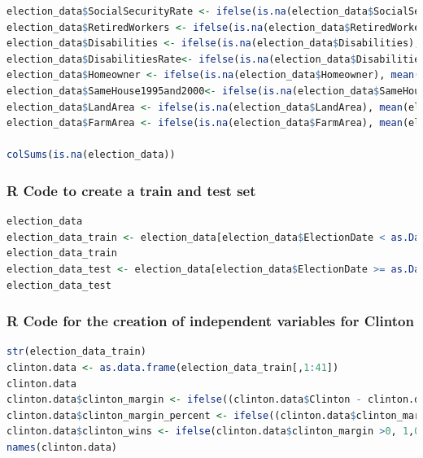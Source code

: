 \documentclass[11pt]{article}
\begin{document}
\begin{lstlisting}[language=R]
election_data$SocialSecurityRate <- ifelse(is.na(election_data$SocialSecurityRate), mean(election_data$SocialSecurityRate, na.rm=TRUE), election_data$SocialSecurityRate)
election_data$RetiredWorkers <- ifelse(is.na(election_data$RetiredWorkers), mean(election_data$RetiredWorkers, na.rm=TRUE), election_data$RetiredWorkers)
election_data$Disabilities <- ifelse(is.na(election_data$Disabilities), mean(election_data$Disabilities, na.rm=TRUE), election_data$Disabilities)
election_data$DisabilitiesRate<- ifelse(is.na(election_data$DisabilitiesRate), mean(election_data$DisabilitiesRate, na.rm=TRUE), election_data$DisabilitiesRate)
election_data$Homeowner <- ifelse(is.na(election_data$Homeowner), mean(election_data$Homeowner, na.rm=TRUE), election_data$Homeowner)
election_data$SameHouse1995and2000<- ifelse(is.na(election_data$SameHouse1995and2000), mean(election_data$SameHouse1995and2000, na.rm=TRUE), election_data$SameHouse1995and2000)
election_data$LandArea <- ifelse(is.na(election_data$LandArea), mean(election_data$LandArea, na.rm=TRUE), election_data$LandArea)
election_data$FarmArea <- ifelse(is.na(election_data$FarmArea), mean(election_data$FarmArea, na.rm=TRUE), election_data$FarmArea)

colSums(is.na(election_data))
\end{lstlisting}


\subsubsection{R Code to create a train and test set}
\begin{lstlisting}[language=R]
election_data
election_data_train <- election_data[election_data$ElectionDate < as.Date("2/19/08", format="%m/%d/%y"),]
election_data_train
election_data_test <- election_data[election_data$ElectionDate >= as.Date("2/19/2008", format="%m/%d/%Y"),]
election_data_test
\end{lstlisting}

\subsubsection{R Code for the creation of independent variables for Clinton}
\begin{lstlisting}[language=R]
str(election_data_train)
clinton.data <- as.data.frame(election_data_train[,1:41])
clinton.data
clinton.data$clinton_margin <- ifelse((clinton.data$Clinton - clinton.data$Obama)>0,1,0)
clinton.data$clinton_margin_percent <- ifelse((clinton.data$clinton_margin/clinton.data$TotalVote)>0,1,0)
clinton.data$clinton_wins <- ifelse(clinton.data$clinton_margin >0, 1,0)
names(clinton.data)
\end{lstlisting}
\end{document}
